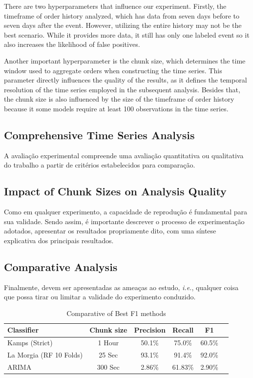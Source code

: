 \documentclass[12pt]{article}
\begin{document}
	There are two hyperparameters that influence our experiment.
	Firstly, the timeframe of order history analyzed, which has data from seven days before to seven days after the event.
	However, utilizing the entire history may not be the best scenario.
	While it provides more data, it still has only one labeled event so it also increases the likelihood of false positives.

	Another important hyperparameter is the chunk size, which determines the time window used to aggregate orders when constructing the time series.
	This parameter directly influences the quality of the results, as it defines the temporal resolution of the time series employed in the subsequent analysis.
	Besides that, the chunk size is also influenced by the size of the timeframe of order history because it some models require at least 100 observations in the time series.

	\subsection{Comprehensive Time Series Analysis}
	\label{subsec_result_series_evals}
	
	A avaliação experimental compreende uma avaliação quantitativa ou qualitativa do trabalho a partir de critérios estabelecidos para comparação.

	\subsection{Impact of Chunk Sizes on Analysis Quality}
	\label{subsec_result_time_interval}

	Como em qualquer experimento, a capacidade de reprodução é fundamental para sua validade.
	Sendo assim, é importante descrever o processo de experimentação adotados, apresentar os resultados propriamente dito, com uma síntese explicativa dos principais resultados.

	\subsection{Comparative Analysis}
	\label{subsec_result_comparing}
	Finalmente, devem ser apresentadas as ameaças ao estudo, \emph{i.e.}, qualquer coisa que possa tirar ou limitar a validade do experimento conduzido.

	\begin{table}[!ht]
        \centering
        \caption{Comparative of Best F1 methods}
        \begin{tabular}{lccccc}
            \toprule
            \textbf{Classifier} & \textbf{Chunk size} & \textbf{Precision} & \textbf{Recall} & \textbf{F1} \\
            \midrule
            Kamps (Strict) & 1 Hour & 50.1\% & 75.0\% & 60.5\% \\
            La Morgia (RF 10 Folds) & 25 Sec & 93.1\% & 91.4\% & 92.0\% \\
            ARIMA & 300 Sec & 2.86\% & 61.83\% & 2.90\% \\
            \bottomrule
        \end{tabular}
        \label{tab_comparison}
    \end{table}
	
\end{document}
